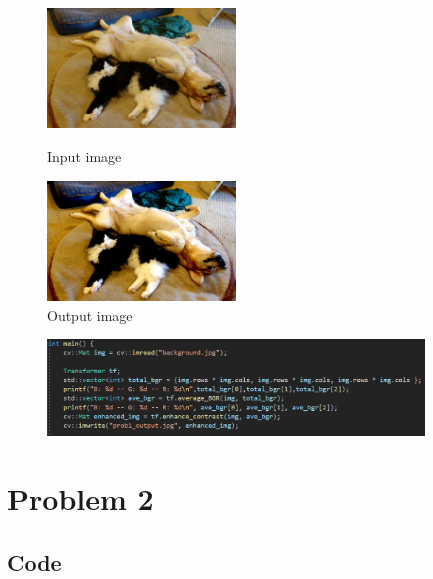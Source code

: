 \documentclass[12p,letterpaper]{article}
\begin{document}
			\begin{figure}[h]
				\centering
				\begin{minipage}{.25\textwidth}
					\centering
					\includegraphics[width=5cm]{images/prob1_input.jpg}
					\caption{Input image}
				\end{minipage}
				\begin{minipage}{.5\textwidth}
					\centering
					\includegraphics[width=5cm]{images/prob1_output.jpg}
					\caption{Output image}
				\end{minipage}
			\end{figure}

			\begin{figure}[h]
				\centering
				\includegraphics[width=10cm]{images/main1.PNG}
			\end{figure}
			
	\pagebreak
	\section{Problem 2}
		
		\subsection{Code}
\end{document}
